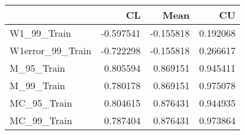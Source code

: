 \begin{tabular}{lrrr}
\toprule
{} &        CL &      Mean &        CU \\
\midrule
W1\_99\_Train      & -0.597541 & -0.155818 &  0.192068 \\
W1error\_99\_Train & -0.722298 & -0.155818 &  0.266617 \\
M\_95\_Train       &  0.805594 &  0.869151 &  0.945411 \\
M\_99\_Train       &  0.780178 &  0.869151 &  0.975078 \\
MC\_95\_Train      &  0.804615 &  0.876431 &  0.944935 \\
MC\_99\_Train      &  0.787404 &  0.876431 &  0.973864 \\
\bottomrule
\end{tabular}
